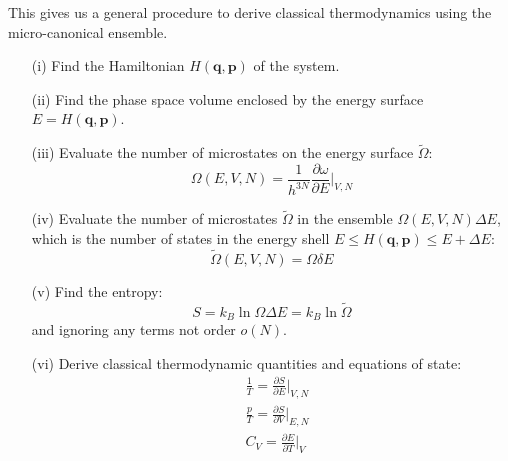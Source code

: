 \documentclass[a4paper,11pt,oneside]{book}
\begin{document}
This gives us a general procedure to derive classical thermodynamics using the micro-canonical ensemble. 
\begin{enumerate}
    \item[(i)] Find the Hamiltonian $H(\textbf{q},\textbf{p})$ of the system. 
    \item[(ii)] Find the phase space volume enclosed by the energy surface $E=H(\textbf{q},\textbf{p})$. 
    \item[(iii)] Evaluate the number of microstates on the energy surface $\tilde \Omega$:
    \begin{equation}
       \Omega(E,V,N) = \frac{1}{h^{3N}} \frac{\partial \omega}{\partial E}\bigg|_{V,N}
    \end{equation}
    \item[(iv)] Evaluate the number of microstates $\tilde \Omega$ in the ensemble $\Omega(E,V,N) \Delta E$, which is the number of states in the energy shell $E\leq H(\textbf{q},\textbf{p})\leq E+\Delta E$:
    \begin{equation}
        \tilde \Omega(E,V,N) = \Omega \delta E
    \end{equation}
 
    \item[(v)] Find the entropy:
    \begin{equation}
        S = k_B \ln \Omega \Delta E = k_B \ln \tilde \Omega
    \end{equation}
    and ignoring any terms not order $o(N)$. 
    \item[(vi)] Derive classical thermodynamic quantities and equations of state:
    \begin{align}
    &\frac{1}{T} = \frac{\partial S}{\partial E}\bigg|_{V,N}\\
    &\frac{p}{T} = \frac{\partial S}{\partial V}\bigg|_{E,N} \\
    &C_V = \frac{\partial E}{\partial T}\bigg|_V 
\end{align}
\end{enumerate}
\end{document}
